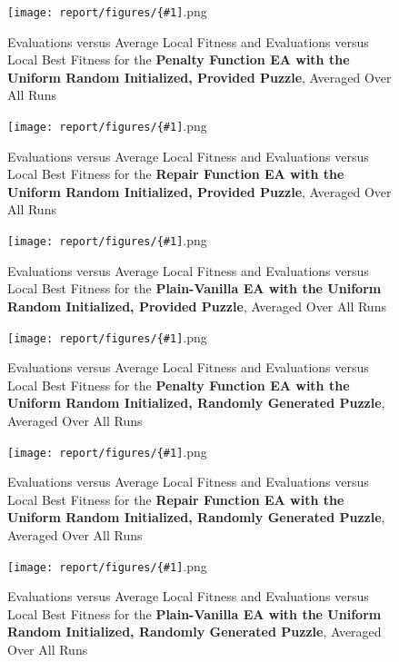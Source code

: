 \documentclass[11pt]{article}
\newcommand{\fitnessplotcaption}[1]{\caption{Evaluations versus Average Local Fitness and Evaluations versus 
    Local Best Fitness for the \textbf{{#1}}, Averaged Over All Runs}}
\newcommand{\addgraphic}[1]{\centerline{\texttt{[image: report/figures/\{\#1]}.png}}}
\begin{document}
\begin{figure}
    \addgraphic{website_puzzle_uniform_random_graph}
    \fitnessplotcaption{Penalty Function EA with the Uniform Random Initialized, Provided Puzzle}
    \label{fig:website_puzzle_uniform_random_graph}
\end{figure}

\begin{figure}
    \addgraphic{website_puzzle_uniform_random_bonus_graph}
    \fitnessplotcaption{Repair Function EA with the Uniform Random Initialized, Provided Puzzle}
    \label{fig:website_puzzle_uniform_random_bonus_graph}
\end{figure}

\begin{figure}
    \addgraphic{website_puzzle_uniform_random_vanilla_graph}
    \fitnessplotcaption{Plain-Vanilla EA with the Uniform Random Initialized, Provided Puzzle}
    \label{fig:website_puzzle_uniform_random_vanilla_graph}
\end{figure}

\begin{figure}
    \addgraphic{random_gen_uniform_random_graph}
    \fitnessplotcaption{Penalty Function EA with the Uniform Random Initialized, Randomly Generated Puzzle}
    \label{fig:random_gen_uniform_random_graph}
\end{figure}

\begin{figure}
    \addgraphic{random_gen_uniform_random_bonus_graph}
    \fitnessplotcaption{Repair Function EA with the Uniform Random Initialized, Randomly Generated Puzzle}
    \label{fig:random_gen_uniform_random_bonus_graph}
\end{figure}

\begin{figure}
    \addgraphic{random_gen_uniform_random_vanilla_graph}
    \fitnessplotcaption{Plain-Vanilla EA with the Uniform Random Initialized, Randomly Generated Puzzle}
    \label{fig:random_gen_uniform_random_vanilla_graph}
\end{figure}
\end{document}
